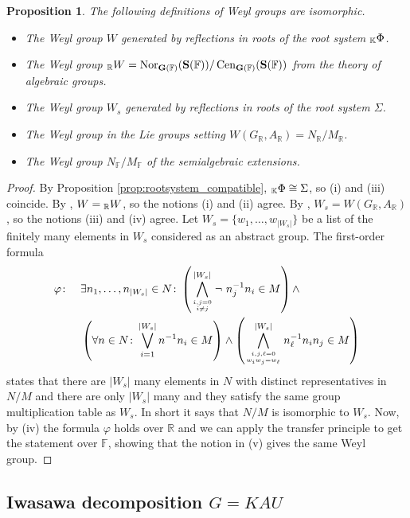 \documentclass[12pt]{amsart}
\newcommand{\F}{\mathbb{F} }
\newcommand{\R}{\mathbb{R} }
\newcommand{\K}{\mathbb{K}}
\newcommand{\bG}{\mathbf{G}}
\newcommand{\bS}{\mathbf{S}}
\newcommand{\KPhi}{\vphantom{\Phi}_{\K}\Phi}
\newcommand{\RW}{\vphantom{W}_{\R}W}
\numberwithin{equation}{section}
\newtheorem{proposition}[theorem]{Proposition}
\theoremstyle{remark} %
\begin{document}
\begin{proposition} \label{prop:weylgroups}
	The following definitions of Weyl groups are isomorphic.
	\begin{itemize}
		\item [(i)] The Weyl group $W$ generated by reflections in roots of the root system $\KPhi$.
		\item [(ii)] The Weyl group $\RW = \operatorname{Nor}_{\bG(\F)}(\bS(\F))/\operatorname{Cen}_{\bG(\F)}(\bS(\F))$ from the theory of algebraic groups.
		\item [(iii)] The Weyl group $W_s$ generated by reflections in roots of the root system $\Sigma$.
		\item [(iv)] The Weyl group in the Lie groups setting $W(G_{\R},A_{\R}) = N_{\R}/M_{\R} $.
		\item [(v)] The Weyl group $N_{\F}/M_{\F}$ of the semialgebraic extensions.
	\end{itemize}
\end{proposition}
\begin{proof}
	By Proposition \ref{prop:rootsystem_compatible}, $\KPhi \cong \Sigma$, so (i) and (iii) coincide. 
	By \cite[Theorem 21.2]{Bor}, $W=\RW $, so the notions (i) and (ii) agree. By \cite[Proposition 7.32]{Kna}, $W_s = W(G_{\R},A_{\R})$, so the notions (iii) and (iv) agree. Let $W_s = \{w_1, \ldots , w_{|W_s|}\}$ be a list of the finitely many elements in $W_s$ considered as an abstract group. The first-order formula
	\begin{align*}
		\varphi \colon \quad & \exists n_1 , \ldots , n_{|W_s|} \in N \colon 
		\left( \bigwedge_{i,j=0 \atop i\neq j}^{|W_s|} \neg \ n_j^{-1}n_i \in  M \right)  \wedge \\
		&\left(\forall n \in N  \colon \bigvee_{i=1}^{|W_s|}  n^{-1}n_i \in M  \right) \wedge  
		\left( \bigwedge_{i,j,\ell=0 \atop w_iw_j=w_{\ell}}^{|W_s|} n_\ell^{-1}n_in_j \in M \right)
	\end{align*}
	states that there are $|W_s|$ many elements in $N$ with distinct representatives in $N/M$ and there are only $|W_s|$ many and they satisfy the same group multiplication table as $W_s$. In short it says that $N/M$ is isomorphic to $W_s$. Now, by (iv) the formula $\varphi$ holds over $\R$ and we can apply the transfer principle to get the statement over $\F$, showing that the notion in (v) gives the same Weyl group.
\end{proof}


\subsection{Iwasawa decomposition $G=KAU$}\label{sec:KAU}
\end{document}
